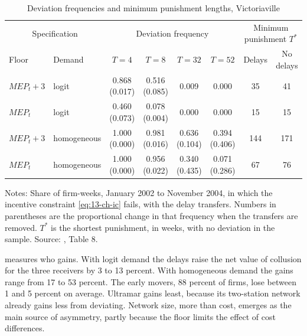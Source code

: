 \begin{table}[htbp]
\centering
\caption{Deviation frequencies and minimum punishment lengths, Victoriaville}\label{tab:13-ch-t8}
\small
\begin{tabular}{llcccccc}
\toprule
\multicolumn{2}{c}{Specification} & \multicolumn{4}{c}{Deviation frequency} & \multicolumn{2}{c}{Minimum punishment $T^*$}\\
\cmidrule(lr){1-2}\cmidrule(lr){3-6}\cmidrule(lr){7-8}
Floor & Demand & $T=4$ & $T=8$ & $T=32$ & $T=52$ & Delays & No delays\\
\midrule
$\textit{MEP}_t+3$ & logit & \makecell{0.868\\(0.017)} & \makecell{0.516\\(0.085)} & 0.009 & 0.000 & 35 & 41\\
\addlinespace
$\textit{MEP}_t$ & logit & \makecell{0.460\\(0.073)} & \makecell{0.078\\(0.004)} & 0.000 & 0.000 & 15 & 15\\
\addlinespace
$\textit{MEP}_t+3$ & homogeneous & \makecell{1.000\\(0.000)} & \makecell{0.981\\(0.016)} & \makecell{0.636\\(0.104)} & \makecell{0.394\\(0.406)} & 144 & 171\\
\addlinespace
$\textit{MEP}_t$ & homogeneous & \makecell{1.000\\(0.000)} & \makecell{0.956\\(0.022)} & \makecell{0.340\\(0.435)} & \makecell{0.071\\(0.286)} & 67 & 76\\
\bottomrule
\end{tabular}

\smallskip
\begin{minipage}{0.92\textwidth}\footnotesize
Notes: Share of firm-weeks, January 2002 to November 2004, in which the incentive constraint \eqref{eq:13-ch-ic} fails, with the
delay transfers. Numbers in parentheses are the proportional change in that frequency when the transfers are removed. $T^*$ is the
shortest punishment, in weeks, with no deviation in the sample. Source: \citet{ClarkHoude2013}, Table 8.
\end{minipage}
\end{table}

 measures who gains. With logit demand the delays raise the net value of collusion for the three receivers by
3 to 13 percent. With homogeneous demand the gains range from 17 to 53 percent. The early movers, 88 percent of firms, lose
between 1 and 5 percent on average.
Ultramar gains least, because its two-station network already gains less from deviating. Network size, more than cost, emerges
as the main source of asymmetry, partly because the floor limits the effect of cost differences.

